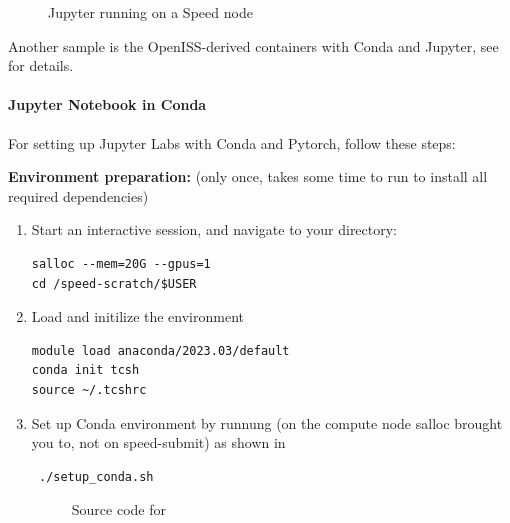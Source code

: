 \begin{figure}[htbp]
	\centering
	\caption{Jupyter running on a Speed node}
	\label{fig:jupyter}
\end{figure}

\noindent Another sample is the OpenISS-derived containers with Conda and Jupyter,
see  for details.

\paragraph{Jupyter Notebook in Conda}
\label{sect:jupyter-conda}

For setting up Jupyter Labs with Conda and Pytorch, follow these steps:

\textbf{Environment preparation:} (only once, takes some time to run to install all required dependencies)
\begin{enumerate}
\item Start an interactive session, and navigate to your  directory:
\begin{verbatim}
salloc --mem=20G --gpus=1
cd /speed-scratch/$USER
\end{verbatim}

\item Load and initilize the environment
\begin{verbatim}
module load anaconda/2023.03/default
conda init tcsh
source ~/.tcshrc
\end{verbatim}

\item Set up Conda environment by runnung 
(on the compute node salloc brought you to, not on speed-submit)
as shown in 
\begin{verbatim} ./setup_conda.sh \end{verbatim}

\small
\begin{figure}[htpb]
    
    \caption{Source code for }
    \label{fig:setup_conda.sh}
\end{figure}
\normalsize
\end{enumerate}

